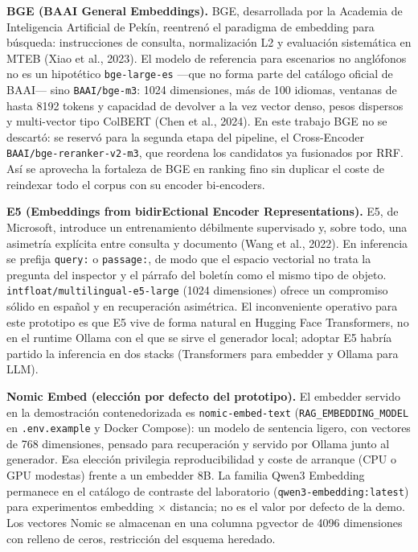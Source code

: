 \textbf{BGE (BAAI General Embeddings).} BGE, desarrollada por la Academia de Inteligencia Artificial de Pekín, reentrenó el paradigma de embedding para búsqueda: instrucciones de consulta, normalización L2 y evaluación sistemática en MTEB (Xiao et al., 2023). El modelo de referencia para escenarios no anglófonos no es un hipotético \texttt{bge-large-es} ---que no forma parte del catálogo oficial de BAAI--- sino \texttt{BAAI/bge-m3}: 1024 dimensiones, más de 100 idiomas, ventanas de hasta 8192 tokens y capacidad de devolver a la vez vector denso, pesos dispersos y multi-vector tipo ColBERT (Chen et al., 2024). En este trabajo BGE no se descartó: se reservó para la segunda etapa del pipeline, el Cross-Encoder \texttt{BAAI/bge-reranker-v2-m3}, que reordena los candidatos ya fusionados por RRF. Así se aprovecha la fortaleza de BGE en ranking fino sin duplicar el coste de reindexar todo el corpus con su encoder bi-encoders.

\textbf{E5 (Embeddings from bidirEctional Encoder Representations).} E5, de Microsoft, introduce un entrenamiento débilmente supervisado y, sobre todo, una asimetría explícita entre consulta y documento (Wang et al., 2022). En inferencia se prefija \texttt{query:} o \texttt{passage:}, de modo que el espacio vectorial no trata la pregunta del inspector y el párrafo del boletín como el mismo tipo de objeto. \texttt{intfloat/multilingual-e5-large} (1024 dimensiones) ofrece un compromiso sólido en español y en recuperación asimétrica. El inconveniente operativo para este prototipo es que E5 vive de forma natural en Hugging Face Transformers, no en el runtime Ollama con el que se sirve el generador local; adoptar E5 habría partido la inferencia en dos stacks (Transformers para embedder y Ollama para LLM).

\textbf{Nomic Embed (elección por defecto del prototipo).} El embedder servido en la demostración contenedorizada es \texttt{nomic-embed-text} (\texttt{RAG\_EMBEDDING\_MODEL} en \texttt{.env.example} y Docker Compose): un modelo de sentencia ligero, con vectores de 768 dimensiones, pensado para recuperación y servido por Ollama junto al generador. Esa elección privilegia reproducibilidad y coste de arranque (CPU o GPU modestas) frente a un embedder 8B. La familia Qwen3 Embedding permanece en el catálogo de contraste del laboratorio (\texttt{qwen3-embedding:latest}) para experimentos embedding $\times$ distancia; no es el valor por defecto de la demo. Los vectores Nomic se almacenan en una columna pgvector de 4096 dimensiones con relleno de ceros, restricción del esquema heredado.

